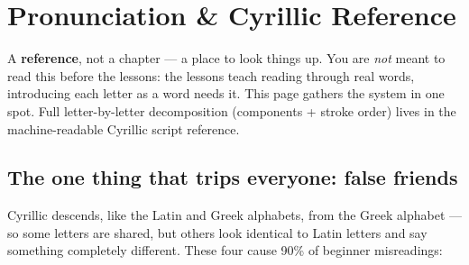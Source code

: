 
\chapter*{Pronunciation \& Cyrillic Reference}

A \textbf{reference}, not a chapter — a place to look things up. You are \emph{not} meant to read this before the lessons: the lessons teach reading through real words, introducing each letter as a word needs it. This page gathers the system in one spot. Full letter-by-letter decomposition (components + stroke order) lives in the machine-readable Cyrillic script reference.

\section*{The one thing that trips everyone: false friends}

Cyrillic descends, like the Latin and Greek alphabets, from the Greek alphabet — so some letters are shared, but others look identical to Latin letters and say something completely different. These four cause 90\% of beginner misreadings:

